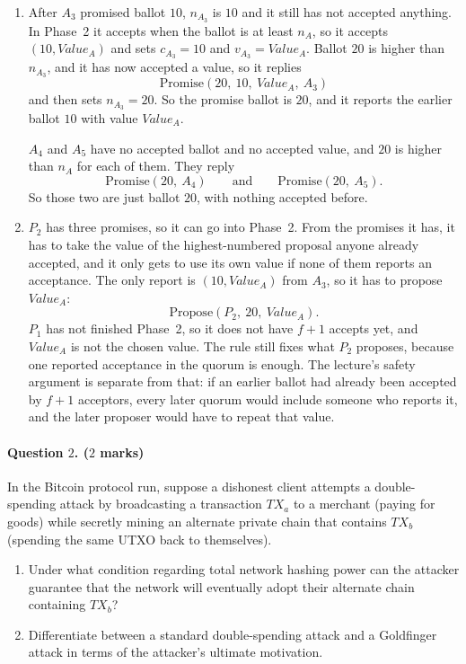 \documentclass{article}
\begin{document}
\begin{enumerate}
    \item After $A_3$ promised ballot $10$, $n_{A_3}$ is $10$ and it still has not accepted anything. In Phase~2 it accepts when the ballot is at least $n_A$, so it accepts $(10, Value_A)$ and sets $c_{A_3} = 10$ and $v_{A_3} = Value_A$. Ballot $20$ is higher than $n_{A_3}$, and it has now accepted a value, so it replies
    \[
        \mathrm{Promise}(20,\ 10,\ Value_A,\ A_3)
    \]
    and then sets $n_{A_3} = 20$. So the promise ballot is $20$, and it reports the earlier ballot $10$ with value $Value_A$.

    $A_4$ and $A_5$ have no accepted ballot and no accepted value, and $20$ is higher than $n_A$ for each of them. They reply
    \[
        \mathrm{Promise}(20,\ A_4)
        \qquad\text{and}\qquad
        \mathrm{Promise}(20,\ A_5).
    \]
    So those two are just ballot $20$, with nothing accepted before.

    \item $P_2$ has three promises, so it can go into Phase~2. From the promises it has, it has to take the value of the highest-numbered proposal anyone already accepted, and it only gets to use its own value if none of them reports an acceptance. The only report is $(10, Value_A)$ from $A_3$, so it has to propose $Value_A$:
    \[
        \mathrm{Propose}(P_2,\ 20,\ Value_A).
    \]
    $P_1$ has not finished Phase~2, so it does not have $f+1$ accepts yet, and $Value_A$ is not the chosen value. The rule still fixes what $P_2$ proposes, because one reported acceptance in the quorum is enough. The lecture's safety argument is separate from that: if an earlier ballot had already been accepted by $f+1$ acceptors, every later quorum would include someone who reports it, and the later proposer would have to repeat that value.
\end{enumerate}

\bigskip

\paragraph{Question $2$. ($2$ marks)}
In the Bitcoin protocol run, suppose a dishonest client attempts a double-spending attack by broadcasting a transaction $TX_a$ to a merchant (paying for goods) while secretly mining an alternate private chain that contains $TX_b$ (spending the same UTXO back to themselves). 
\begin{enumerate}
    \item Under what condition regarding total network hashing power can the attacker guarantee that the network will eventually adopt their alternate chain containing $TX_b$? 
    \item Differentiate between a standard double-spending attack and a Goldfinger attack in terms of the attacker's ultimate motivation. 

\end{enumerate}
\end{document}
